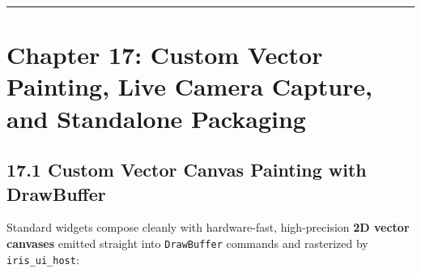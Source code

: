 \documentclass[
  english,
  oneside]{book}
\begin{document}
\begin{center}\rule{0.5\linewidth}{0.5pt}\end{center}

\chapter{Chapter 17: Custom Vector Painting, Live Camera Capture, and
Standalone
Packaging}\label{chapter-17-custom-vector-painting-live-camera-capture-and-standalone-packaging}

\section{17.1 Custom Vector Canvas Painting with
DrawBuffer}\label{custom-vector-canvas-painting-with-drawbuffer}

Standard widgets compose cleanly with hardware-fast, high-precision
\textbf{2D vector canvases} emitted straight into \texttt{DrawBuffer}
commands and rasterized by \texttt{iris\_ui\_host}:
\end{document}
